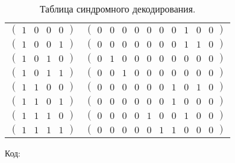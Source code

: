 \documentclass{article}
\begin{document}
\begin{table}[h]
\begin{tabular}{c c}
        $\begin{pmatrix}1&0&0&0\end{pmatrix}$&$\begin{pmatrix}0&0&0&0&0&0&0&1&0&0\end{pmatrix}$\\
        $\begin{pmatrix}1&0&0&1\end{pmatrix}$&$\begin{pmatrix}0&0&0&0&0&0&0&1&1&0\end{pmatrix}$\\
        $\begin{pmatrix}1&0&1&0\end{pmatrix}$&$\begin{pmatrix}0&1&0&0&0&0&0&0&0&0\end{pmatrix}$\\
        $\begin{pmatrix}1&0&1&1\end{pmatrix}$&$\begin{pmatrix}0&0&1&0&0&0&0&0&0&0\end{pmatrix}$\\
        $\begin{pmatrix}1&1&0&0\end{pmatrix}$&$\begin{pmatrix}0&0&0&0&0&0&1&0&1&0\end{pmatrix}$\\
        $\begin{pmatrix}1&1&0&1\end{pmatrix}$&$\begin{pmatrix}0&0&0&0&0&0&1&0&0&0\end{pmatrix}$\\
        $\begin{pmatrix}1&1&1&0\end{pmatrix}$&$\begin{pmatrix}0&0&0&0&1&0&0&1&0&0\end{pmatrix}$\\
        $\begin{pmatrix}1&1&1&1\end{pmatrix}$&$\begin{pmatrix}0&0&0&0&0&1&1&0&0&0\end{pmatrix}$\\ \bottomrule
    \end{tabular}
    \caption{Таблица синдромного декодирования.}
\end{table}
Код:
\inputminted[linenos]{python}{../../code/ch2/syndec.py}
\end{document}
